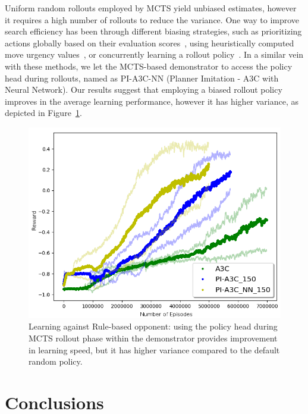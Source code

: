 \documentclass[letterpaper]{article}
\begin{document}
Uniform random rollouts employed by MCTS yield unbiased estimates, however it requires a high number of rollouts to reduce the variance. One way to improve search efficiency has been through different biasing strategies, such as prioritizing actions globally based on their evaluation scores~\cite{kartal2014user},
using heuristically computed move urgency values~\cite{bouzy2005associating}, or concurrently learning a rollout policy~\cite{ilhan2017monte}. In a similar vein with these methods, we let the MCTS-based demonstrator to access the policy head during rollouts, named as PI-A3C-NN (Planner Imitation - A3C with Neural Network). Our results suggest that employing a biased rollout policy improves in the average learning performance, however it has higher variance, as depicted in Figure~\ref{fig:simple_rollout_biasing}.

\begin{figure}
\centering
\includegraphics[scale=0.305]{simple_mc_vs_ags_150.png}
\caption{Learning against Rule-based opponent: using the policy head during MCTS rollout phase within the demonstrator provides improvement in learning speed, but it has higher variance compared to the default random policy.}
\label{fig:simple_rollout_biasing}
\end{figure}

\section{Conclusions}
\end{document}
